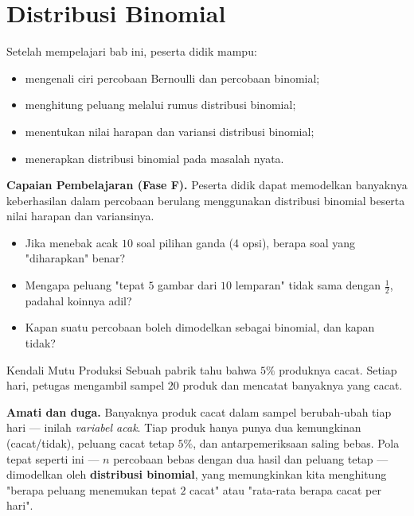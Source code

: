 \documentclass[11pt,a4paper]{report}
\theoremstyle{gaya}
\begin{document}
\chapter{Distribusi Binomial}
\begin{tujuan}
Setelah mempelajari bab ini, peserta didik mampu:
\begin{itemize}[leftmargin=*,topsep=2pt]
  \item mengenali ciri percobaan Bernoulli dan percobaan binomial;
  \item menghitung peluang melalui rumus distribusi binomial;
  \item menentukan nilai harapan dan variansi distribusi binomial;
  \item menerapkan distribusi binomial pada masalah nyata.
\end{itemize}
\textbf{Capaian Pembelajaran (Fase F).} Peserta didik dapat memodelkan banyaknya keberhasilan dalam percobaan berulang menggunakan distribusi binomial beserta nilai harapan dan variansinya.
\end{tujuan}

\begin{pemantik}
\begin{itemize}[leftmargin=*,topsep=2pt]
  \item Jika menebak acak $10$ soal pilihan ganda (4 opsi), berapa soal yang "diharapkan" benar?
  \item Mengapa peluang "tepat $5$ gambar dari $10$ lemparan" tidak sama dengan $\tfrac12$, padahal koinnya adil?
  \item Kapan suatu percobaan boleh dimodelkan sebagai binomial, dan kapan tidak?
\end{itemize}
\end{pemantik}

\begin{studikasus}{Kendali Mutu Produksi}
Sebuah pabrik tahu bahwa $5\%$ produknya cacat. Setiap hari, petugas mengambil sampel $20$ produk dan mencatat banyaknya yang cacat.
\smallskip

\textbf{Amati dan duga.} Banyaknya produk cacat dalam sampel berubah-ubah tiap hari --- inilah \emph{variabel acak}. Tiap produk hanya punya dua kemungkinan (cacat/tidak), peluang cacat tetap $5\%$, dan antarpemeriksaan saling bebas. Pola tepat seperti ini --- $n$ percobaan bebas dengan dua hasil dan peluang tetap --- dimodelkan oleh \textbf{distribusi binomial}, yang memungkinkan kita menghitung "berapa peluang menemukan tepat $2$ cacat" atau "rata-rata berapa cacat per hari".
\end{studikasus}
\end{document}

